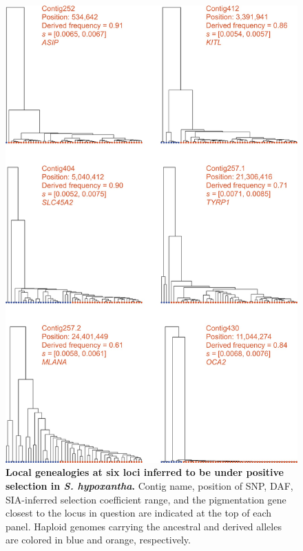\begin{figure}
    \centering
    \includegraphics[scale=0.25]{SIA_figs/SIA_F7.jpeg}
    \caption[Local genealogies at six loci inferred to be under positive selection in \textit{S. hypoxantha}.]{\textbf{Local genealogies at six loci inferred to be under positive selection in \textit{S. hypoxantha}.} Contig name, position of \acs{SNP}, \ac{DAF}, \ac{SIA}-inferred selection coefficient range, and the pigmentation gene closest to the locus in question are indicated at the top of each panel. Haploid genomes carrying the ancestral and derived alleles are colored in blue and orange, respectively.}
    \label{fig:SIA-F7}
\end{figure}

